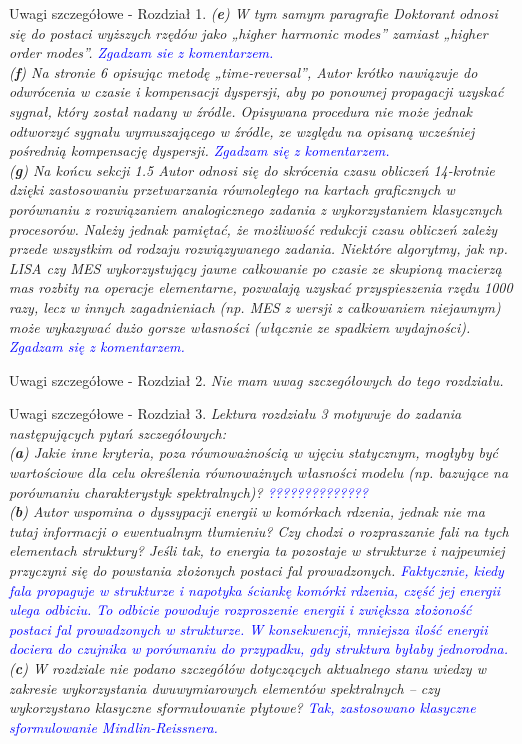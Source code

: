 \documentclass[10pt,aspectratio=169]{beamer} %
\begin{document}
\begin{frame}[label=frame42]{Uwagi szczegółowe - Rozdział 1.}\justifying
\textit{(\textbf{e}) W tym samym paragrafie Doktorant odnosi się do postaci wyższych rzędów jako „higher harmonic modes” zamiast „higher order modes”. \textcolor{blue}{Zgadzam sie z komentarzem.}\\
(\textbf{f}) Na stronie 6 opisując metodę „time-reversal”, Autor krótko nawiązuje do odwrócenia w czasie i kompensacji dyspersji, aby po ponownej propagacji uzyskać sygnał, który został nadany w źródle. Opisywana procedura nie może jednak odtworzyć sygnału	wymuszającego w źródle, ze względu na opisaną wcześniej pośrednią kompensację dyspersji. \textcolor{blue}{Zgadzam się z komentarzem.}\\
(\textbf{g}) Na końcu sekcji 1.5 Autor odnosi się do skrócenia czasu obliczeń 14-krotnie dzięki zastosowaniu przetwarzania równoległego na kartach graficznych w porównaniu z	rozwiązaniem analogicznego zadania z wykorzystaniem klasycznych procesorów. Należy jednak pamiętać, że możliwość redukcji czasu obliczeń zależy przede wszystkim od rodzaju rozwiązywanego zadania. Niektóre algorytmy, jak np. LISA czy MES wykorzystujący jawne całkowanie po czasie ze skupioną macierzą mas rozbity na operacje elementarne, pozwalają uzyskać przyspieszenia rzędu 1000 razy, lecz w innych zagadnieniach (np. MES z wersji z całkowaniem niejawnym) może wykazywać dużo gorsze własności (włącznie ze spadkiem wydajności). \textcolor{blue}{Zgadzam się z komentarzem.}}
\end{frame}
\begin{frame}[label=frame4]{Uwagi szczegółowe - Rozdział 2.}\justifying
\textit{Nie mam uwag szczegółowych do tego rozdziału.}
\end{frame}
\begin{frame}[label=frame4]{Uwagi szczegółowe - Rozdział 3.}\justifying
\textit{Lektura rozdziału 3 motywuje do zadania następujących pytań szczegółowych:\\
(\textbf{a}) Jakie inne kryteria, poza równoważnością w ujęciu statycznym, mogłyby być wartościowe dla celu określenia równoważnych własności modelu (np. bazujące na porównaniu charakterystyk spektralnych)? \textcolor{blue}{??????????????}\\
(\textbf{b}) Autor wspomina o dyssypacji energii w komórkach rdzenia, jednak nie ma tutaj informacji o ewentualnym tłumieniu? Czy chodzi o rozpraszanie fali na tych elementach struktury? Jeśli tak, to energia ta pozostaje w strukturze i najpewniej przyczyni się do	powstania złożonych postaci fal prowadzonych. \textcolor{blue}{Faktycznie, kiedy fala propaguje w strukturze i napotyka ściankę komórki rdzenia, część jej energii ulega odbiciu. To odbicie powoduje rozproszenie energii i zwiększa złożoność postaci fal prowadzonych w strukturze. W konsekwencji, mniejsza ilość energii dociera do czujnika w porównaniu do przypadku, gdy struktura byłaby jednorodna.}\\
(\textbf{c}) W rozdziale nie podano szczegółów dotyczących aktualnego stanu wiedzy w zakresie wykorzystania dwuwymiarowych elementów spektralnych – czy wykorzystano	klasyczne sformułowanie płytowe? \textcolor{blue}{Tak, zastosowano klasyczne sformulowanie Mindlin-Reissnera.}}
\end{frame}
\end{document}
